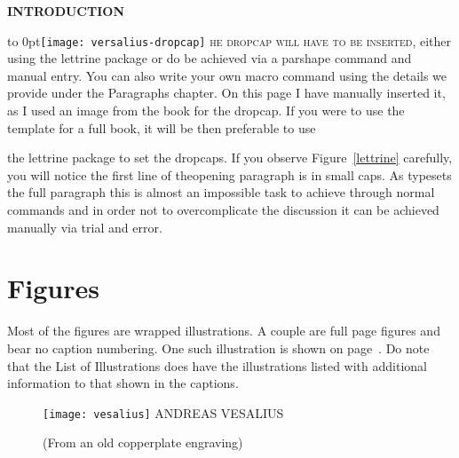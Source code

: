 \LARGE\bfseries INTRODUCTION\par
\egroup
\def\dropcapversalius{%
\vbox to 0pt{\vskip6pt\leavevmode\noindent\texttt{[image: versalius-dropcap]}%
}%
}
\parindent0pt

 
\dropcapversalius \textsc{he dropcap will have to be inserted}, either using the lettrine package or do be achieved via a parshape command and manual entry. You can also write your own macro command using the details we provide under the Paragraphs chapter. On this page I have manually inserted it, as I used an image from the book for the dropcap. If you were to use the template for a full book, it will be then preferable to use

the lettrine package to set the dropcaps. If you observe Figure~\ref{lettrine} carefully, you will notice the first line of theopening paragraph is in small caps. As \tex typesets the full paragraph this is almost an impossible task to achieve through normal \tex commands and in order not to overcomplicate the discussion it can be achieved manually via trial and error. 

\section{Figures}

Most of the figures are wrapped illustrations. A couple are full page figures and bear no caption numbering. One such illustration is shown on page~\pageref{fig:vesalius}. Do note that the List of Illustrations does have the illustrations listed with additional information to that shown in the captions. 

\begin{figure}[p]
\centering
\texttt{[image: vesalius]}
\centering
ANDREAS VESALIUS\par
(From an old copperplate engraving)\par
\label{fig:vesalius}
\end{figure}






